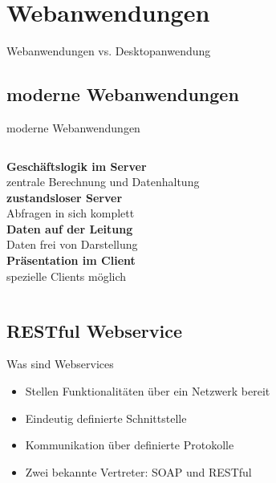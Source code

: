 \section{Webanwendungen}

\begin{frame}{Webanwendungen vs. Desktopanwendung}
  \begin{center}
    
  \end{center}
\end{frame}

\subsection{moderne Webanwendungen}

\begin{frame}{moderne Webanwendungen}{}
  \begin{columns}
    \column{2cm}
    \column{\textwidth}
    {\color{maincolor}\bfseries Geschäftslogik im Server} \\
      \qquad zentrale Berechnung und Datenhaltung \\[1ex]
    {\color{maincolor}\bfseries zustandsloser Server} \\
      \qquad Abfragen in sich komplett \\[1ex]
    {\color{maincolor}\bfseries Daten auf der Leitung} \\
      \qquad Daten frei von Darstellung \\[1ex]
    {\color{maincolor}\bfseries Präsentation im Client} \\
      \qquad spezielle Clients möglich
  \end{columns}
\end{frame}

\subsection{RESTful Webservice}

\begin{frame}{Was sind Webservices}
  \begin{itemize}
    \item Stellen Funktionalitäten über ein Netzwerk bereit
    \item Eindeutig definierte Schnittstelle
    \item Kommunikation über definierte Protokolle
    \item Zwei bekannte Vertreter: SOAP und RESTful
  \end{itemize}
\end{frame}

